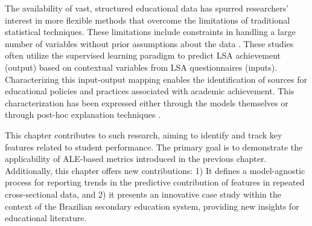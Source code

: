 The availability of vast, structured educational data has spurred researchers' interest in more flexible methods that overcome the limitations of traditional statistical techniques. These limitations include constraints in handling a large number of variables without prior assumptions about the data \cite{Martinez-Abad2018BigEducation, Masci2018StudentApproach}. These studies often utilize the supervised learning paradigm to predict LSA achievement (output) based on contextual variables from LSA questionnaires (inputs). Characterizing this input-output mapping enables the identification of sources for educational policies and practices associated with academic achievement. This characterization has been expressed either through the models themselves \cite{Gomes2020PresentingDataset, SilvaFilho2019DataInstitutes} or through post-hoc explanation techniques \cite{Gabriel2018ALiteracy, Schiltz2018UsingApproach}.

This chapter contributes to such research, aiming to identify and track key features related to student performance. The primary goal is to demonstrate the applicability of ALE-based metrics introduced in the previous chapter. Additionally, this chapter offers new contributions: 1) It defines a model-agnostic process for reporting trends in the predictive contribution of features in repeated cross-sectional data, and 2) it presents an innovative case study within the context of the Brazilian secondary education system, providing new insights for educational literature.



